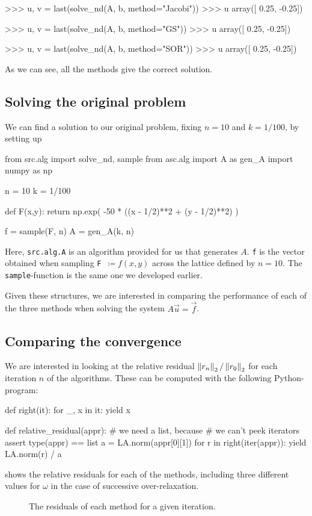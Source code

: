 \documentclass[12pt]{article}
\begin{document}
\begin{multicols}{2}
\begin{python}
>>> u, v = last(solve_nd(A, b, method="Jacobi"))
>>> u
array([ 0.25, -0.25])

>>> u, v = last(solve_nd(A, b, method="GS"))
>>> u
array([ 0.25, -0.25])

>>> u, v = last(solve_nd(A, b, method="SOR"))
>>> u
array([ 0.25, -0.25])
    \end{python}
    As we can see, all the methods give the correct solution.

    \subsection*{Solving the original problem}

    We can find a solution to our original problem,
    fixing $n = 10$ and $k = 1/100$, by setting up
    \begin{python}
from src.alg import solve_nd, sample
from asc.alg import A as gen_A
import numpy as np

n = 10
k = 1/100

def F(x,y):
    return np.exp(
        -50 * ((x - 1/2)**2 + (y - 1/2)**2)
    )

f = sample(F, n)
A = gen_A(k, n)
    \end{python}
    Here, {\tt src.alg.A} is an algorithm provided for us that generates $A$.
    {\tt f} is the vector obtained when sampling
    \mbox{{\tt F} $\coloneqq f(x, y)$} across the lattice defined by $n = 10$.
    The {\tt sample}-function is the same one we developed earlier.

    Given these structures, we are interested in comparing the performance of each of
    the three methods when solving the system $A \vec u = \vec f$.

    \subsection{Comparing the convergence}
    We are interested in looking at the relative residual
    $\Norm[2]{r_n} / \Norm[2]{r_0}$ for each iteration $n$ of the
    algorithms. These can be computed with the following Python-program:
    \begin{python}
def right(it):
    for _, x in it: yield x

def relative_residual(appr):
    # we need a list, because
    # we can't peek iterators
    assert type(appr) == list
    a = LA.norm(appr[0][1])
    for r in right(iter(appr)):
        yield LA.norm(r) / a
    \end{python}
     shows the relative residuals for each of the methods,
    including three different values for $\omega$ in the case of
    successive over-relaxation.
    \begin{figure}[H]
        \centering
        
        \caption{
            The residuals of each method for a given iteration.
        }
        \label{fig:residuals}
    \end{figure}\noindent





\end{multicols}
\end{document}
